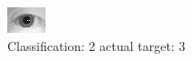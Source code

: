 \begin{figure}[h!]
\begin{center}
\includegraphics[width=0.60\columnwidth]{figures/ID1175_class_2_target_3.png}
\end{center}
\caption{ Classification: 2 actual target: 3}
\label{fig:ID1175_class_2_target_3}
\end{figure}

